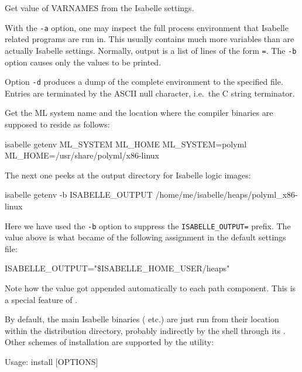 \begin{isabellebody}
\begin{isamarkuptext}
\begin{ttbox}
  Get value of VARNAMES from the Isabelle settings.
\end{ttbox}

  With the \verb|-a| option, one may inspect the full process
  environment that Isabelle related programs are run in. This usually
  contains much more variables than are actually Isabelle settings.
  Normally, output is a list of lines of the form \verb|=|. The \verb|-b| option
  causes only the values to be printed.

  Option \verb|-d| produces a dump of the complete environment
  to the specified file.  Entries are terminated by the ASCII null
  character, i.e.\ the C string terminator.%
\end{isamarkuptext}%
\isamarkuptrue%
%
\isamarkuptrue%
%
\begin{isamarkuptext}%
Get the ML system name and the location where the compiler binaries
  are supposed to reside as follows:
\begin{ttbox}
isabelle getenv ML_SYSTEM ML_HOME
{\out ML_SYSTEM=polyml}
{\out ML_HOME=/usr/share/polyml/x86-linux}
\end{ttbox}

  The next one peeks at the output directory for Isabelle logic
  images:
\begin{ttbox}
isabelle getenv -b ISABELLE_OUTPUT
{\out /home/me/isabelle/heaps/polyml_x86-linux}
\end{ttbox}
  Here we have used the \verb|-b| option to suppress the
  \verb|ISABELLE_OUTPUT=| prefix.  The value above is what
  became of the following assignment in the default settings file:
\begin{ttbox}
ISABELLE_OUTPUT="\$ISABELLE_HOME_USER/heaps"
\end{ttbox}

  Note how the \hyperlink{setting.ML-IDENTIFIER}{\mbox{}} value got appended
  automatically to each path component. This is a special feature of
  \hyperlink{setting.ISABELLE-OUTPUT}{\mbox{}}.%
\end{isamarkuptext}%
\isamarkuptrue%
%
\isamarkuptrue%
%
\begin{isamarkuptext}%
By default, the main Isabelle binaries (\hyperlink{executable.isabelle}{\mbox{}}
  etc.)  are just run from their location within the distribution
  directory, probably indirectly by the shell through its \hyperlink{setting.PATH}{\mbox{}}.  Other schemes of installation are supported by the
  \hypertarget{tool.install}{\hyperlink{tool.install}{\mbox{}}} utility:
\begin{ttbox}
Usage: install [OPTIONS]


\end{ttbox}
\end{isamarkuptext}
\end{isabellebody}
